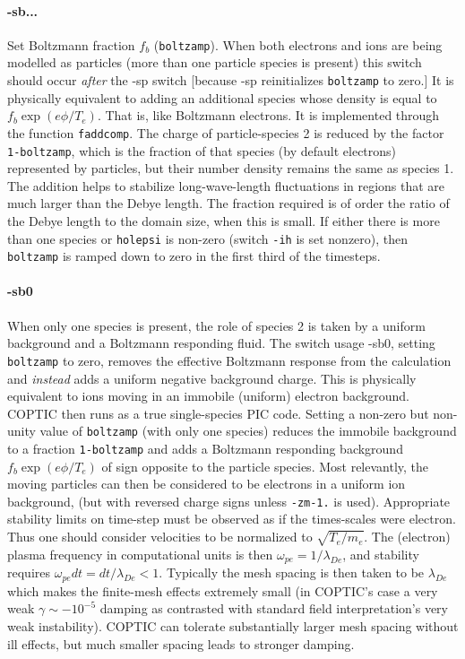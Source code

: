 \documentclass[12pt]{article}
\begin{document}
\paragraph{-sb...} Set Boltzmann fraction $f_b$
(\verb!boltzamp!). When both electrons and ions are being modelled as
particles (more than one particle species is present) this switch
should occur \emph{after} the -sp switch [because -sp reinitializes
\verb!boltzamp! to zero.] It is physically equivalent
to adding an additional species whose density is equal to
$f_b\exp(e\phi/T_e)$. That is, like Boltzmann electrons.  It is
implemented through the function \verb!faddcomp!. The charge of
particle-species 2 is reduced by the factor \verb!1-boltzamp!, which
is the fraction of that species (by default electrons) represented by
particles, but their number density remains the same as species 1.  The
addition helps to stabilize long-wave-length fluctuations in regions
that are much larger than the Debye length. The fraction required is
of order the ratio of the Debye length to the domain size, when this
is small. If either there is more than one species or \verb!holepsi!
is non-zero (switch \verb!-ih! is set nonzero), then \verb!boltzamp!
is ramped down to zero in the first third of the timesteps.

\paragraph{-sb0} When only one species is present, the role of species
2 is taken by a uniform background and a Boltzmann responding
fluid. The switch usage -sb0, setting \verb!boltzamp! to zero, removes
the effective Boltzmann response from the calculation and
\emph{instead} adds a uniform negative background charge.  This is
physically equivalent to ions moving in an immobile (uniform) electron
background.  COPTIC then runs as a true single-species PIC
code. Setting a non-zero but non-unity value of \verb!boltzamp! (with
only one species) reduces the immobile background to a fraction
\verb!1-boltzamp! and adds a Boltzmann responding background
$f_b\exp(e\phi/T_e)$ of sign opposite to the particle species. Most
relevantly, the moving particles can then be considered to be
electrons in a uniform ion background, (but with reversed charge signs
unless \verb!-zm-1.! is used). Appropriate stability limits on
time-step must be observed as if the times-scales were electron. Thus
one should consider velocities to be normalized to
$\sqrt{T_e/m_e}$. The (electron) plasma frequency in computational
units is then $\omega_{pe}=1/\lambda_{De}$, and stability requires
$\omega_{pe}dt = dt/\lambda_{De}<1$. Typically the mesh spacing is
then taken to be $\lambda_{De}$ which makes the finite-mesh effects
extremely small (in COPTIC's case a very weak $\gamma \sim -10^{-5}$
damping as contrasted with standard field interpretation's very weak
instability). COPTIC can tolerate substantially larger mesh spacing
without ill effects, but much smaller spacing leads to stronger
damping.
\end{document}

